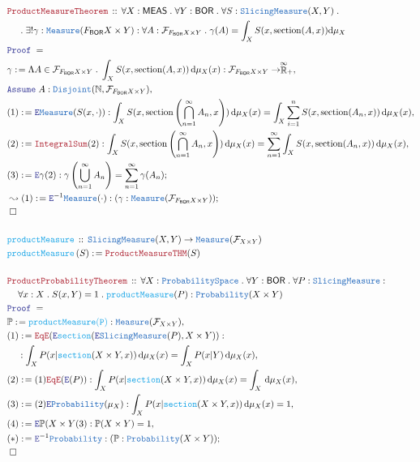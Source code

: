 \documentclass[12pt]{scrartcl}
\newcommand{\TYPE}[1]{\textcolor{NavyBlue}{\mathtt{#1}}}
\newcommand{\FUNC}[1]{\textcolor{Cerulean}{\mathtt{#1}}}
\newcommand{\LOGIC}[1]{\textcolor{Blue}{\mathtt{#1}}}
\newcommand{\THM}[1]{\textcolor{Maroon}{\mathtt{#1}}}
\renewcommand{\.}{\; . \;}
\newcommand{\de}{: \kern 0.1pc =}
\newcommand{\Act}[1]{\left( #1 \right)}
\newcommand{\Theorem}[2]{& \THM{#1} \, :: \, #2 \\ & \Proof = \\ }
\newcommand{\DeclareFunc}[2]{& \FUNC{#1} \, :: \, #2 \\}
\newcommand{\DefineFunc}[3]{&  \FUNC{#1}\Act{#2} \de #3 \\}
\newcommand{\NewLine}{\\ & \kern 1pc}
\newcommand{\Page}[1]{ \begin{align*} #1 \end{align*}   }
\newcommand{\ForEach}[3]{\forall #1 : #2 \. #3 }
\newcommand{\Exist}[2]{\exists #1 : #2}
\newcommand{\Nat}{\mathbb{N} }
\newcommand{\EReals}{\stackrel{\mathclap{\infty}}{\mathbb{R}}}
\newcommand{\Say}[3]{& #1 \de #2 : #3, \\}
\newcommand{\Conclude}[3]{& #1 \de #2 : #3; \\}
\newcommand{\DeriveConclude}[3]{& \leadsto #1 \de #2 : #3 ; \\}
\newcommand{\Assume}[2]{& \LOGIC{Assume} \; #1 : #2, \\}
\newcommand{\ByDef}{\LOGIC{E}}
\newcommand{\QED}{\; \square}
\newcommand{\EndProof}{& \QED \\}
\newcommand{\Proof}{\LOGIC{Proof} \; }
\newcommand{\BOR}{\mathsf{BOR}}
\newcommand{\F}{\mathcal{F}}
\begin{document}
\Page{
 \Theorem{ProductMeasureTheorem}{
 \ForEach{X}{\mathsf{MEAS}}{
 \ForEach{Y}{\mathsf{BOR}}{
 \ForEach{S}{\TYPE{SlicingMeasure}(X,Y)}{
  \NewLine \.
 \Exist{!\gamma}{\TYPE{Measure}(F_{\mathsf{BOR}} X \times Y)
  : 
  \ForEach{A}{ \F_{F_{\mathsf{BOR}} X \times Y} }{
  \gamma(A) = \int_X S(x ,\mathrm{section}(A,x)) \mathrm{d}\mu_X  
 }}}}}}
\Say{\gamma}{ \Lambda A \in \F_{ F_\BOR X \times Y} \. \int_X S( x, \mathrm{section}(A,x) ) \, \mathrm{d}\mu_X(x) }{\F_{F_\BOR X \times Y} \to \EReals_+}
\Assume{ A }{\TYPE{Disjoint}(\Nat,\F_{F_\BOR X \times Y})}
\Say{(1)}{ \ByDef\TYPE{Measure}(S(x, \cdot))} {\int_X S( x, \mathrm{section}\Act{ \bigcap^\infty_{n=1} A_n,x} ) \, \mathrm{d}\mu_X(x) =
\int_X \sum^n_{i = 1} S( x, \mathrm{section}(A_n,x) ) \, \mathrm{d}\mu_X(x)}
\Say{(2)}{\THM{IntegralSum}(2)}{\int_X S( x, \mathrm{section}\Act{ \bigcap^\infty_{n=1} A_n,x} ) \, \mathrm{d}\mu_X(x) =
\sum^\infty_{n=1} \int_X  S( x, \mathrm{section}(A_n,x) ) \, \mathrm{d}\mu_X(x)}
\Conclude{(3)}{\ByDef \gamma (2)}{ \gamma\Act{\bigcup^\infty_{n = 1} A_n} = \sum^\infty_{n = 1} \gamma(A_n)}
\DeriveConclude{(1)}{ \ByDef^{-1} \TYPE{Measure}(\cdot) }{ (\gamma : \TYPE{Measure}(\F_{F_\BOR X \times Y}))}
\EndProof
\\
\DeclareFunc{productMeasure}{ \TYPE{SlicingMeasure}(X,Y) \to \TYPE{Measure}(\F_{X \times Y})}
\DefineFunc{productMeasure}{S}{\THM{ProductMeasureTHM}(S)}
\\
\Theorem{ProductProbabilityTheorem}{
\ForEach{X}{\TYPE{ProbabilitySpace}}{
\ForEach{Y}{\BOR}{
\ForEach{P}{ \TYPE{SlicingMeasure} : \NewLine \ForEach{x}{X}{ S(x, Y) = 1}  }{
\FUNC{productMeasure}(P) : \TYPE{Probability}(X \times Y ) 
}}}}
\Say{\mathbb{P}}{\FUNC{productMeasure(P)}}{\TYPE{Measure}(\F_{X \times Y})}
\Say{(1)}{\THM{EqE}(\ByDef\FUNC{section}(\ByDef\TYPE{SlicingMeasure}(P),X \times Y))}{\NewLine : \int_X P(x | \FUNC{section}(X \times Y,x)) \, \mathrm{d}\mu_X(x) 
 = \int_X P(x  | Y) \, \mathrm{d}\mu_X(x)  }
\Say{(2)}{(1)\THM{EqE}(\ByDef(P))}{ \int_X P(x | \FUNC{section}(X \times Y,x)) \, \mathrm{d}\mu_X(x) 
 = \int_X \, \mathrm{d}\mu_X(x)}
\Say{(3)}{(2)\ByDef \TYPE{Probability}(\mu_X)}{\int_X P(x | \FUNC{section}(X \times Y,x)) \, \mathrm{d}\mu_X(x) = 1 }
\Say{(4)}{\ByDef{\mathbb{P}(X \times Y}(3)}{\mathbb{P}(X \times Y) = 1}
\Conclude{(*)}{\ByDef^{-1}\TYPE{Probability}}{(\mathbb{P} : \TYPE{Probability}(X \times Y))}
\EndProof
}
 \newpage
\end{document}
